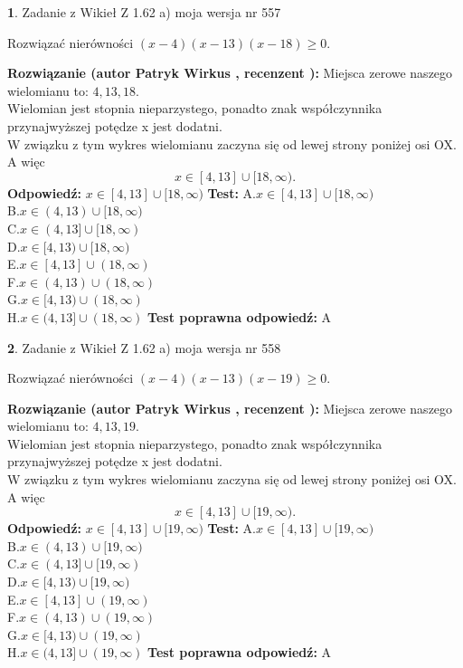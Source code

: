 \documentclass[12pt, a4paper]{article}
\theoremstyle{definition} %
\newtheorem{zad}{}
\newcommand{\zadStart}[1]{\begin{zad}#1\newline}
\newcommand{\zadStop}{\end{zad}}
\newcommand{\rozwStart}[2]{\noindent \textbf{Rozwiązanie (autor #1 , recenzent #2): }\newline}
\newcommand{\rozwStop}{\newline}
\newcommand{\odpStart}{\noindent \textbf{Odpowiedź:}\newline}
\newcommand{\odpStop}{\newline}
\newcommand{\testStart}{\noindent \textbf{Test:}\newline}
\newcommand{\testStop}{\newline}
\newcommand{\kluczStart}{\noindent \textbf{Test poprawna odpowiedź:}\newline}
\newcommand{\kluczStop}{\newline}
\begin{document}
\zadStart{Zadanie z Wikieł Z 1.62 a) moja wersja nr 557}

Rozwiązać nierówności $(x-4)(x-13)(x-18)\ge0$.
\zadStop
\rozwStart{Patryk Wirkus}{}
Miejsca zerowe naszego wielomianu to: $4, 13, 18$.\\
Wielomian jest stopnia nieparzystego, ponadto znak współczynnika przy\linebreak najwyższej potędze x jest dodatni.\\ W związku z tym wykres wielomianu zaczyna się od lewej strony poniżej osi OX. A więc $$x \in [4,13] \cup [18,\infty).$$
\rozwStop
\odpStart
$x \in [4,13] \cup [18,\infty)$
\odpStop
\testStart
A.$x \in [4,13] \cup [18,\infty)$\\
B.$x \in (4,13) \cup [18,\infty)$\\
C.$x \in (4,13] \cup [18,\infty)$\\
D.$x \in [4,13) \cup [18,\infty)$\\
E.$x \in [4,13] \cup (18,\infty)$\\
F.$x \in (4,13) \cup (18,\infty)$\\
G.$x \in [4,13) \cup (18,\infty)$\\
H.$x \in (4,13] \cup (18,\infty)$
\testStop
\kluczStart
A
\kluczStop



\zadStart{Zadanie z Wikieł Z 1.62 a) moja wersja nr 558}

Rozwiązać nierówności $(x-4)(x-13)(x-19)\ge0$.
\zadStop
\rozwStart{Patryk Wirkus}{}
Miejsca zerowe naszego wielomianu to: $4, 13, 19$.\\
Wielomian jest stopnia nieparzystego, ponadto znak współczynnika przy\linebreak najwyższej potędze x jest dodatni.\\ W związku z tym wykres wielomianu zaczyna się od lewej strony poniżej osi OX. A więc $$x \in [4,13] \cup [19,\infty).$$
\rozwStop
\odpStart
$x \in [4,13] \cup [19,\infty)$
\odpStop
\testStart
A.$x \in [4,13] \cup [19,\infty)$\\
B.$x \in (4,13) \cup [19,\infty)$\\
C.$x \in (4,13] \cup [19,\infty)$\\
D.$x \in [4,13) \cup [19,\infty)$\\
E.$x \in [4,13] \cup (19,\infty)$\\
F.$x \in (4,13) \cup (19,\infty)$\\
G.$x \in [4,13) \cup (19,\infty)$\\
H.$x \in (4,13] \cup (19,\infty)$
\testStop
\kluczStart
A
\kluczStop
\end{document}
